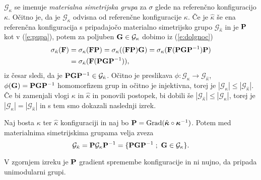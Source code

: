 $\mathcal{G}_{\kappa}$ se imenuje \emph{materialna simetrijska grupa} za $\sigma$ glede
na referenčno konfiguracijo $\kappa$. Očitno je, da je $\mathcal{G}_{\kappa}$ odvisna od
referenčne konfiguracije $\kappa$. Če je $\hat{\kappa}$ še ena referenčna konfiguracija
s pripadajočo materialno simetrijsko grupo $\mathcal{G}_{\hat{\kappa}}$
in je $\mathbf P$ kot v (\ref{e:pupa}), potem za poljuben
$\mathbf G\in\mathcal{G}_{\kappa}$ dobimo iz (\ref{e:dolgnoc})
\begin{align*}
	\sigma_{\hat{\kappa}}(\mathbf F)&=\sigma_{\kappa}(\mathbf F\mathbf P)
	=\sigma_{\kappa}((\mathbf F\mathbf P)\mathbf G)
	=\sigma_{\kappa}(\mathbf F(\mathbf P\mathbf G\mathbf P^{-1})\mathbf P) \\
	&=\sigma_{\hat{\kappa}}(\mathbf F(\mathbf P\mathbf G\mathbf P^{-1})),
\end{align*}
iz česar sledi, da je $\mathbf P\mathbf G\mathbf P^{-1}\in\mathcal{G}_{\hat{\kappa}}$.
Očitno je preslikava $\phi\colon\mathcal{G}_{\kappa}\to\mathcal{G}_{\hat{\kappa}}$,
$\phi(\mathbf G)=\mathbf P\mathbf G\mathbf P^{-1}$ homomorfizem grup in očitno je injektivna,
torej je $|\mathcal{G}_{\kappa}|\leq|\mathcal{G}_{\hat{\kappa}}|$. Če bi zamenjali vlogi
$\kappa$ in $\hat{\kappa}$ in ponovili postopek, bi dobili še
$|\mathcal{G}_{\hat{\kappa}}|\leq|\mathcal{G}_{\kappa}|$,
torej je $|\mathcal{G}_{\kappa}|=|\mathcal{G}_{\hat{\kappa}}|$ in
s tem smo dokazali naslednji izrek.

\begin{izrek}
	Naj bosta $\kappa$ ter $\hat{\kappa}$ konfiguraciji in naj bo
	$\mathbf P=\mathrm{Grad}(\hat{\boldsymbol \kappa}\circ\boldsymbol \kappa^{-1})$. Potem
	med materialnima simetrijskima grupama velja zveza
	\[
		\mathcal{G}_{\hat{\kappa}}=\ten{P}\mathcal{G}_{\kappa}\ten{P}^{-1}
		=\{\ten{P}\ten{G}\ten{P}^{-1}\;;\ \ten{G}\in\mathcal{G}_{\kappa}\}.
	\]
\end{izrek}

V zgornjem izreku je $\mathbf P$ gradient spremembe konfiguracije in ni nujno,
da pripada unimodularni grupi.

\begin{comment}
Podobno, kot smo definirali materialno simetrijsko grupo za $\sigma$, bi lahko
definirali tudi materialno simetrijsko grupo za $\ten{T}$. Za elastične
materiale velja definicija, da je materialno telo \emph{trdno}, če obstaja
referenčna konfiguracija telesa, tako da je materialna simetrijska grupa za $\ten{T}$
glede na to konfiguracijo podgrupa ortogonalne grupe $\mathscr{O}(V)$.
Taki referenčni konfiguraciji se reče \emph{naravna referenčna konfiguracija}. Dokazati se da,
da sta pri hiperelastičnih trdnih telesih materialni simetrijski grupi za $\sigma$ in za $\ten{T}$ enaki.
\end{comment}

